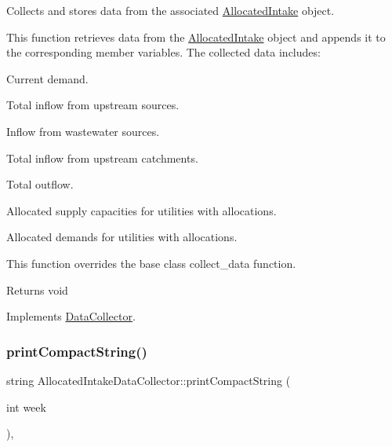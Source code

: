 Collects and stores data from the associated \mbox{\hyperlink{classAllocatedIntake}{Allocated\+Intake}} object. 

This function retrieves data from the \mbox{\hyperlink{classAllocatedIntake}{Allocated\+Intake}} object and appends it to the corresponding member variables. The collected data includes\+:
\begin{DoxyItemize}
\item Current demand.
\item Total inflow from upstream sources.
\item Inflow from wastewater sources.
\item Total inflow from upstream catchments.
\item Total outflow.
\item Allocated supply capacities for utilities with allocations.
\item Allocated demands for utilities with allocations.
\end{DoxyItemize}

This function overrides the base class {\ttfamily collect\+\_\+data} function.

\begin{DoxyReturn}{Returns}
void 
\end{DoxyReturn}


Implements \mbox{\hyperlink{classDataCollector_a01486bf58acbe37b203f97b3b9a79c40}{Data\+Collector}}.

\mbox{\label{classAllocatedIntakeDataCollector_aeadb39cfe7fc84264e3bb83ed26b0621}} 
\subsubsection{\texorpdfstring{print\+Compact\+String()}{printCompactString()}}
{\footnotesize\ttfamily string Allocated\+Intake\+Data\+Collector\+::print\+Compact\+String (\begin{DoxyParamCaption}\item[{int}]{week }\end{DoxyParamCaption})\hspace{0.3cm}{\ttfamily [override]}, {\ttfamily [virtual]}}



